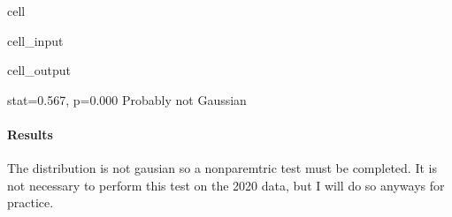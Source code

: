 \documentclass[letterpaper,10pt,english]{jupyterBook}
\begin{document}
\begin{sphinxuseclass}{cell}\begin{sphinxVerbatimInput}

\begin{sphinxuseclass}{cell_input}
\begin{sphinxVerbatim}[commandchars=\\\{\}]
  
   
   
\end{sphinxVerbatim}

\end{sphinxuseclass}\end{sphinxVerbatimInput}
\begin{sphinxVerbatimOutput}

\begin{sphinxuseclass}{cell_output}
\begin{sphinxVerbatim}[commandchars=\\\{\}]
stat=0.567, p=0.000
Probably not Gaussian
\end{sphinxVerbatim}

\end{sphinxuseclass}\end{sphinxVerbatimOutput}

\end{sphinxuseclass}

\paragraph{Results}
\label{\detokenize{notebooks/testing_malaysian_paper:results}}
\sphinxAtStartPar
The distribution is not gausian so a non\sphinxhyphen{}paremtric test must be completed.  It is not necessary to perform this test on the 2020 data, but I will do so anyways for practice.
\end{document}
